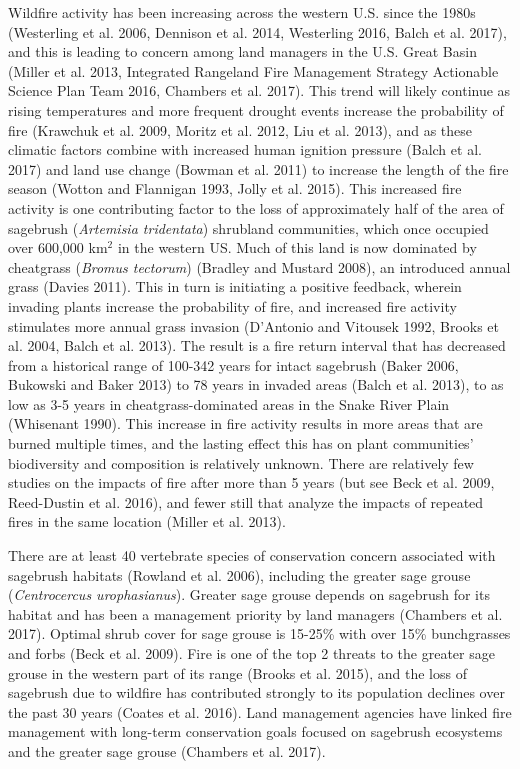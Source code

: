 \documentclass[12pt,]{article}
\begin{document}
Wildfire activity has been increasing across the western U.S. since the
1980s (Westerling et al. 2006, Dennison et al. 2014, Westerling 2016,
Balch et al. 2017), and this is leading to concern among land managers
in the U.S. Great Basin (Miller et al. 2013, Integrated Rangeland Fire
Management Strategy Actionable Science Plan Team 2016, Chambers et al.
2017). This trend will likely continue as rising temperatures and more
frequent drought events increase the probability of fire (Krawchuk et
al. 2009, Moritz et al. 2012, Liu et al. 2013), and as these climatic
factors combine with increased human ignition pressure (Balch et al.
2017) and land use change (Bowman et al. 2011) to increase the length of
the fire season (Wotton and Flannigan 1993, Jolly et al. 2015). This
increased fire activity is one contributing factor to the loss of
approximately half of the area of sagebrush (\emph{Artemisia
tridentata}) shrubland communities, which once occupied over 600,000
km\(^2\) in the western US. Much of this land is now dominated by
cheatgrass (\emph{Bromus tectorum}) (Bradley and Mustard 2008), an
introduced annual grass (Davies 2011). This in turn is initiating a
positive feedback, wherein invading plants increase the probability of
fire, and increased fire activity stimulates more annual grass invasion
(D'Antonio and Vitousek 1992, Brooks et al. 2004, Balch et al. 2013).
The result is a fire return interval that has decreased from a
historical range of 100-342 years for intact sagebrush (Baker 2006,
Bukowski and Baker 2013) to 78 years in invaded areas (Balch et al.
2013), to as low as 3-5 years in cheatgrass-dominated areas in the Snake
River Plain (Whisenant 1990). This increase in fire activity results in
more areas that are burned multiple times, and the lasting effect this
has on plant communities' biodiversity and composition is relatively
unknown. There are relatively few studies on the impacts of fire after
more than 5 years (but see Beck et al. 2009, Reed-Dustin et al. 2016),
and fewer still that analyze the impacts of repeated fires in the same
location (Miller et al. 2013).

There are at least 40 vertebrate species of conservation concern
associated with sagebrush habitats (Rowland et al. 2006), including the
greater sage grouse (\emph{Centrocercus urophasianus}). Greater sage
grouse depends on sagebrush for its habitat and has been a management
priority by land managers (Chambers et al. 2017). Optimal shrub cover
for sage grouse is 15-25\% with over 15\% bunchgrasses and forbs (Beck
et al. 2009). Fire is one of the top 2 threats to the greater sage
grouse in the western part of its range (Brooks et al. 2015), and the
loss of sagebrush due to wildfire has contributed strongly to its
population declines over the past 30 years (Coates et al. 2016). Land
management agencies have linked fire management with long-term
conservation goals focused on sagebrush ecosystems and the greater sage
grouse (Chambers et al. 2017).
\end{document}
